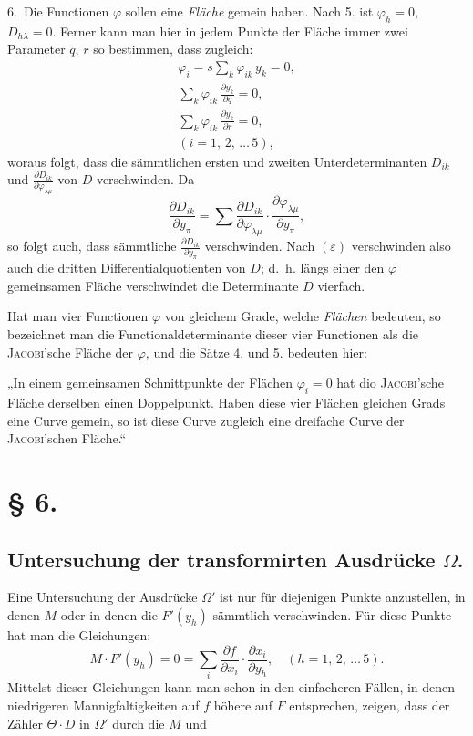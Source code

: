 \documentclass{article}
\begin{document}
6.~Die Functionen $\varphi$ sollen eine \emph{Fläche} gemein haben. Nach 5. ist $\varphi_h = 0$, $D_{h\lambda} = 0$. Ferner kann man hier in jedem Punkte der Fläche immer zwei Parameter $q$, $r$ so bestimmen, dass zugleich:
\[
\begin{gathered}
\varphi_i = s \sum_k \varphi_{ik} \, y_k = 0, \\
\sum_k \varphi_{ik} \, \frac{\partial y_k}{\partial q} = 0, \\
\sum_k \varphi_{ik} \, \frac{\partial y_k}{\partial r} = 0, \\
(i = 1,\, 2,\, \dots\, 5),
\end{gathered}
\]
woraus folgt, dass die sämmtlichen ersten und zweiten Unterdeterminanten $D_{ik}$ und $\frac{\partial D_{ik}}{\partial \varphi_{\lambda\mu}}$ von $D$ verschwinden. Da
\[
\frac{\partial D_{ik}}{\partial y_\pi} = \sum \frac{\partial D_{ik}}{\partial \varphi_{\lambda\mu}} \cdot \frac{\partial \varphi_{\lambda\mu}}{\partial y_\pi} ,
\]
so folgt auch, dass sämmtliche $\frac{\partial D_{ik}}{\partial y_\pi}$ verschwinden. Nach $(\varepsilon)$ verschwinden also auch die dritten Differentialquotienten von $D$; d.~h. längs einer den $\varphi$ gemeinsamen Fläche verschwindet die Determinante $D$ vierfach.

Hat man vier Functionen $\varphi$ von gleichem Grade, welche \emph{Flächen} bedeuten, so bezeichnet man die Functionaldeterminante dieser vier Functionen als die \textsc{Jacobi}'sche Fläche der $\varphi$, und die Sätze 4. und 5. bedeuten hier:

„In einem gemeinsamen Schnittpunkte der Flächen $\varphi_i = 0$ hat dio \textsc{Jacobi}'sche Fläche derselben einen Doppelpunkt. Haben diese vier Flächen gleichen Grads eine Curve gemein, so ist diese Curve zugleich eine dreifache Curve der \textsc{Jacobi}'schen Fläche.“

\section*{§ 6.}

\subsection*{Untersuchung der transformirten Ausdrücke $\Omega$.}

Eine Untersuchung der Ausdrücke $\Omega'$ ist nur für diejenigen Punkte anzustellen, in denen $M$ oder in denen die $F'(y_h)$ sämmtlich verschwinden. Für diese Punkte hat man die Gleichungen:
\[
M \cdot F'(y_h) = 0 = \sum_i \frac{\partial f}{\partial x_i} \cdot \frac{\partial x_i}{\partial y_h}, \quad (h = 1,\, 2,\, \dots\, 5).
\]
Mittelst dieser Gleichungen kann man schon in den einfacheren Fällen, in denen niedrigeren Mannigfaltigkeiten auf $f$ höhere auf $F$ entsprechen, zeigen, dass der Zähler $\Theta \cdot D$ in $\Omega'$ durch die $M$ und
\end{document}
